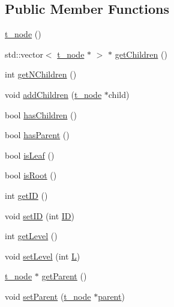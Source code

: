 \subsection*{Public Member Functions}
\begin{DoxyCompactItemize}
\item 
\hyperlink{structt__node_aa0855f08d810effb2c62e0003f9a80dc}{t\+\_\+node} ()
\item 
std\+::vector$<$ \hyperlink{structt__node}{t\+\_\+node} $\ast$ $>$ $\ast$ \hyperlink{structt__node_a7221b5dfc9d6710d7ffbaf59acd916de}{get\+Children} ()
\item 
int \hyperlink{structt__node_a3253babb783d6c4f5df3dd441581180d}{get\+N\+Children} ()
\item 
void \hyperlink{structt__node_af5fb14150f95112e1e525e09f924f507}{add\+Children} (\hyperlink{structt__node}{t\+\_\+node} $\ast$child)
\item 
bool \hyperlink{structt__node_a97b3fded9e34ad0bf2873695e5813e3d}{has\+Children} ()
\item 
bool \hyperlink{structt__node_a92a900c7452cca30f4974b4b15326c2c}{has\+Parent} ()
\item 
bool \hyperlink{structt__node_ad39388169d7963221a70c4a4af864ac4}{is\+Leaf} ()
\item 
bool \hyperlink{structt__node_a8f72af855ca7d42a9680aca399524499}{is\+Root} ()
\item 
int \hyperlink{structt__node_aebf69f2d7510e0e746d56146d0ec1b94}{get\+ID} ()
\item 
void \hyperlink{structt__node_ae62cd63088f17a9741dfbbfe0b564690}{set\+ID} (int \hyperlink{structt__node_ad9c1c64db61864861f59b1c6afb74bc0}{ID})
\item 
int \hyperlink{structt__node_a37f4377e664f4b4a8b541df91e35d27b}{get\+Level} ()
\item 
void \hyperlink{structt__node_a4fe63274d162dcffb5ff14c848d19883}{set\+Level} (int \hyperlink{structt__node_a969f3a8447460a76d0aaf85648a02150}{L})
\item 
\hyperlink{structt__node}{t\+\_\+node} $\ast$ \hyperlink{structt__node_ac870573b476905ff91ade58bb9e1b385}{get\+Parent} ()
\item 
void \hyperlink{structt__node_ab9d6536aceb5dbb33eb76f6d8ab2082b}{set\+Parent} (\hyperlink{structt__node}{t\+\_\+node} $\ast$\hyperlink{structt__node_a5a23987dec53ba900f26d5a3b031b2f0}{parent})
\end{DoxyCompactItemize}
